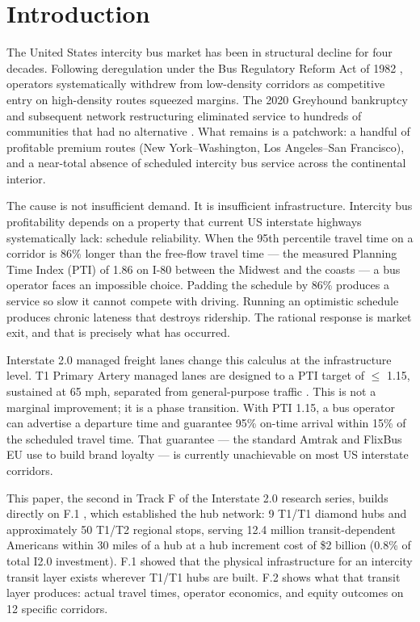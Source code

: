 \section{Introduction}
\label{sec:introduction}

The United States intercity bus market has been in structural decline for four decades. Following deregulation under the Bus Regulatory Reform Act of 1982 \citep{BusRegulatoryReform1982}, operators systematically withdrew from low-density corridors as competitive entry on high-density routes squeezed margins. The 2020 Greyhound bankruptcy and subsequent network restructuring eliminated service to hundreds of communities that had no alternative \citep{Schwieterman2019}. What remains is a patchwork: a handful of profitable premium routes (New York--Washington, Los Angeles--San Francisco), and a near-total absence of scheduled intercity bus service across the continental interior.

The cause is not insufficient demand. It is insufficient infrastructure. Intercity bus profitability depends on a property that current US interstate highways systematically lack: schedule reliability. When the 95th percentile travel time on a corridor is 86\% longer than the free-flow travel time --- the measured Planning Time Index (PTI) of 1.86 on I-80 between the Midwest and the coasts \citep{FHWA_freight2023} --- a bus operator faces an impossible choice. Padding the schedule by 86\% produces a service so slow it cannot compete with driving. Running an optimistic schedule produces chronic lateness that destroys ridership. The rational response is market exit, and that is precisely what has occurred.

Interstate 2.0 managed freight lanes change this calculus at the infrastructure level. T1 Primary Artery managed lanes are designed to a PTI target of $\leq$ 1.15, sustained at 65 mph, separated from general-purpose traffic \citep{ROUTE_E2}. This is not a marginal improvement; it is a phase transition. With PTI 1.15, a bus operator can advertise a departure time and guarantee 95\% on-time arrival within 15\% of the scheduled travel time. That guarantee --- the standard Amtrak and FlixBus EU use to build brand loyalty --- is currently unachievable on most US interstate corridors.

This paper, the second in Track F of the Interstate 2.0 research series, builds directly on F.1 \citep{ROUTE_F1}, which established the hub network: 9 T1/T1 diamond hubs and approximately 50 T1/T2 regional stops, serving 12.4 million transit-dependent Americans within 30 miles of a hub at a hub increment cost of \$2 billion (0.8\% of total I2.0 investment). F.1 showed that the physical infrastructure for an intercity transit layer exists wherever T1/T1 hubs are built. F.2 shows what that transit layer produces: actual travel times, operator economics, and equity outcomes on 12 specific corridors.

